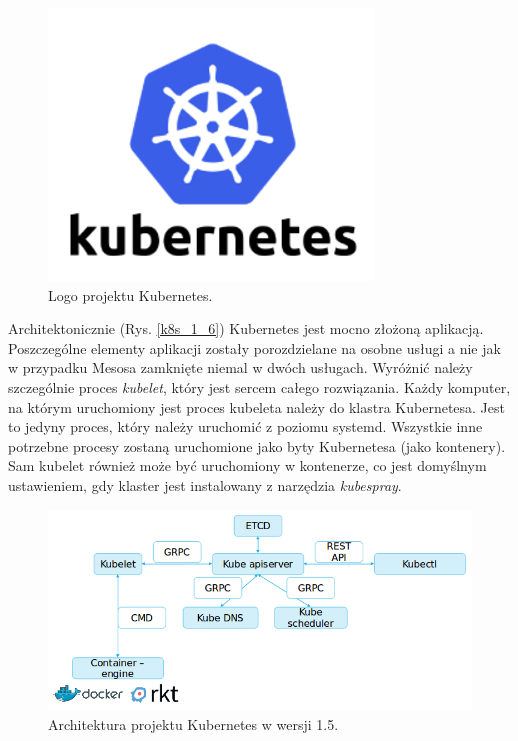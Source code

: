 \documentclass[10pt,a4paper,titlepage,twoside]{report}
\begin{document}
\begin{figure}[!h]
	\centering
	\includegraphics[scale=1]{pics/Kubernetes-logo.png}
	\caption{Logo projektu Kubernetes.}
	\label{kube_logo}
\end{figure}

Architektonicznie \cite{ad36}(Rys. \ref{k8s_1_6}) Kubernetes jest mocno złożoną aplikacją. Poszczególne elementy aplikacji zostały porozdzielane na osobne usługi a nie jak w przypadku Mesosa zamknięte niemal w dwóch usługach. Wyróżnić należy szczególnie proces \textit{kubelet}, który jest sercem całego rozwiązania. Każdy komputer, na którym uruchomiony jest proces kubeleta należy do klastra Kubernetesa. Jest to jedyny proces, który należy uruchomić z poziomu systemd. Wszystkie inne potrzebne procesy zostaną uruchomione jako byty Kubernetesa (jako kontenery). Sam kubelet również może być uruchomiony w kontenerze, co jest domyślnym ustawieniem, gdy klaster jest instalowany z narzędzia \textit{kubespray}. 

\begin{figure}[!h]
	\centering
	\includegraphics[scale=0.7]{pics/k8s_1_5.png}
	\caption{Architektura projektu Kubernetes w wersji 1.5.}
	\label{k8s_1_5}
\end{figure}
\end{document}
